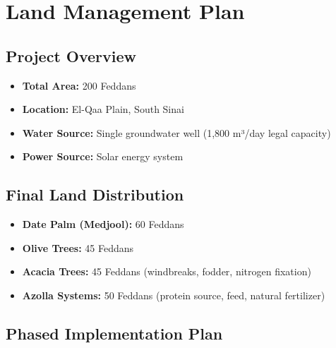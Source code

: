 \section{Land Management Plan}

\subsection{Project Overview}
\begin{itemize}
    \item \textbf{Total Area:} 200 Feddans
    \item \textbf{Location:} El-Qaa Plain, South Sinai
    \item \textbf{Water Source:} Single groundwater well (1,800 m³/day legal capacity)
    \item \textbf{Power Source:} Solar energy system
\end{itemize}

\subsection{Final Land Distribution}
\begin{itemize}
    \item \textbf{Date Palm (Medjool):} 60 Feddans
    \item \textbf{Olive Trees:} 45 Feddans
    \item \textbf{Acacia Trees:} 45 Feddans (windbreaks, fodder, nitrogen fixation)
    \item \textbf{Azolla Systems:} 50 Feddans (protein source, feed, natural fertilizer)
\end{itemize}

\subsection{Phased Implementation Plan}

